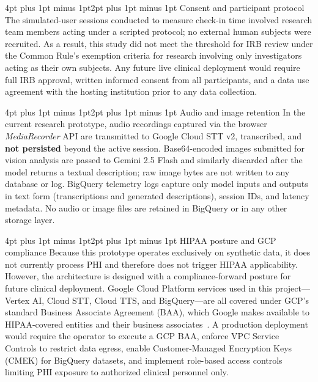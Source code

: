 \documentclass[sigplan,screen]{acmart}
\makeatletter
\renewcommand{\subsection}{\@startsection{subsection}{2}{\z@}
  {4pt plus 1pt minus 1pt}{2pt plus 1pt minus 1pt}
  {\normalfont\normalsize\bfseries}}
\makeatother
\begin{document}
\subsection{Consent and participant protocol}
The simulated-user sessions conducted to measure check-in time involved research
team members acting under a scripted protocol; no external human subjects were
recruited. As a result, this study did not meet the threshold for IRB review
under the Common Rule's exemption criteria for research involving only
investigators acting as their own subjects. Any future live clinical deployment
would require full IRB approval, written informed consent from all participants,
and a data use agreement with the hosting institution prior to any data
collection.

\subsection{Audio and image retention}
In the current research prototype, audio recordings captured via the browser
\textit{MediaRecorder} API are transmitted to Google Cloud STT v2, transcribed,
and \textbf{not persisted} beyond the active session. Base64-encoded images
submitted for vision analysis are passed to Gemini 2.5 Flash and similarly
discarded after the model returns a textual description; raw image bytes are not
written to any database or log. BigQuery telemetry logs capture only model
inputs and outputs in text form (transcriptions and generated descriptions),
session IDs, and latency metadata. No audio or image files are retained in
BigQuery or in any other storage layer.

\subsection{HIPAA posture and GCP compliance}
Because this prototype operates exclusively on synthetic data, it does not
currently process PHI and therefore does not trigger HIPAA applicability.
However, the architecture is designed with a compliance-forward posture for
future clinical deployment. Google Cloud Platform services used in this
project---Vertex AI, Cloud STT, Cloud TTS, and BigQuery---are all covered under
GCP's standard Business Associate Agreement (BAA), which Google makes available
to HIPAA-covered entities and their business associates~\cite{gcpbaa}. A
production deployment would require the operator to execute a GCP BAA, enforce
VPC Service Controls to restrict data egress, enable Customer-Managed Encryption
Keys (CMEK) for BigQuery datasets, and implement role-based access controls
limiting PHI exposure to authorized clinical personnel only.
\end{document}
